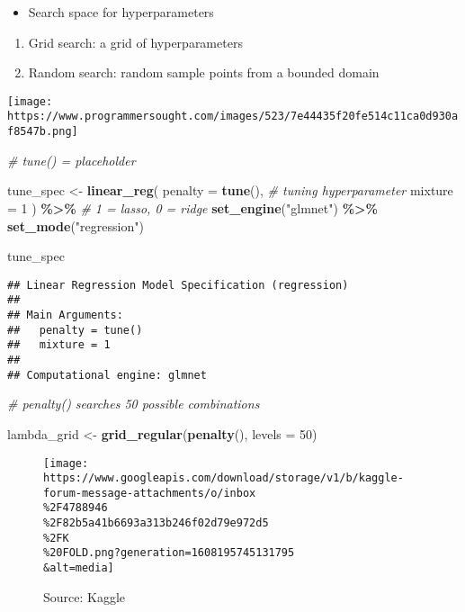 \documentclass[
]{book}
\newenvironment{Shaded}{\begin{snugshade}}{\end{snugshade}}
\newcommand{\CommentTok}[1]{\textcolor[rgb]{0.56,0.35,0.01}{\textit{#1}}}
\newcommand{\DataTypeTok}[1]{\textcolor[rgb]{0.13,0.29,0.53}{#1}}
\newcommand{\DecValTok}[1]{\textcolor[rgb]{0.00,0.00,0.81}{#1}}
\newcommand{\KeywordTok}[1]{\textcolor[rgb]{0.13,0.29,0.53}{\textbf{#1}}}
\newcommand{\NormalTok}[1]{#1}
\newcommand{\OperatorTok}[1]{\textcolor[rgb]{0.81,0.36,0.00}{\textbf{#1}}}
\newcommand{\StringTok}[1]{\textcolor[rgb]{0.31,0.60,0.02}{#1}}
\providecommand{\tightlist}{%
  \setlength{\itemsep}{0pt}\setlength{\parskip}{0pt}}
\begin{document}
\begin{itemize}
\tightlist
\item
  Search space for hyperparameters
\end{itemize}

\begin{enumerate}
\def\labelenumi{\arabic{enumi}.}
\item
  Grid search: a grid of hyperparameters
\item
  Random search: random sample points from a bounded domain
\end{enumerate}

\texttt{[image: https://www.programmersought.com/images/523/7e44435f20fe514c11ca0d930af8547b.png]}

\begin{Shaded}
\begin{Highlighting}[]
\CommentTok{\# tune() = placeholder}

\NormalTok{tune\_spec \textless{}{-}}\StringTok{ }\KeywordTok{linear\_reg}\NormalTok{(}
  \DataTypeTok{penalty =} \KeywordTok{tune}\NormalTok{(), }\CommentTok{\# tuning hyperparameter}
  \DataTypeTok{mixture =} \DecValTok{1}
\NormalTok{) }\OperatorTok{\%\textgreater{}\%}\StringTok{ }\CommentTok{\# 1 = lasso, 0 = ridge}
\StringTok{  }\KeywordTok{set\_engine}\NormalTok{(}\StringTok{"glmnet"}\NormalTok{) }\OperatorTok{\%\textgreater{}\%}
\StringTok{  }\KeywordTok{set\_mode}\NormalTok{(}\StringTok{"regression"}\NormalTok{)}

\NormalTok{tune\_spec}
\end{Highlighting}
\end{Shaded}

\begin{verbatim}
## Linear Regression Model Specification (regression)
## 
## Main Arguments:
##   penalty = tune()
##   mixture = 1
## 
## Computational engine: glmnet
\end{verbatim}

\begin{Shaded}
\begin{Highlighting}[]
\CommentTok{\# penalty() searches 50 possible combinations}

\NormalTok{lambda\_grid \textless{}{-}}\StringTok{ }\KeywordTok{grid\_regular}\NormalTok{(}\KeywordTok{penalty}\NormalTok{(), }\DataTypeTok{levels =} \DecValTok{50}\NormalTok{)}
\end{Highlighting}
\end{Shaded}

\begin{figure}
\centering
\texttt{[image: https://www.googleapis.com/download/storage/v1/b/kaggle-forum-message-attachments/o/inbox\\\%2F4788946\\\%2F82b5a41b6693a313b246f02d79e972d5\\\%2FK\\\%20FOLD.png?generation=1608195745131795\\\&alt=media]}
\caption{Source: Kaggle}
\end{figure}
\end{document}
